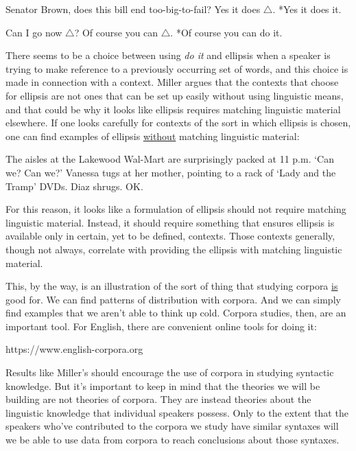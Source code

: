 {\begin{exe}
	\raggedright
	\ex \label{ex:quesell} 
	\begin{xlist}
		 Senator Brown, does this bill end too-big-to-fail?
		 Yes it does $\triangle$.
		 *Yes it does it.
	\end{xlist}
	\ex \label{ex:quesell2}
	\begin{xlist}
		 Can I go now $\triangle$?
		 Of course you can $\triangle$.
		 *Of course you can do it.
	\end{xlist}
\end{exe}
There seems to be a choice between using \emph{do it} and ellipsis when a speaker is trying to make reference to a previously occurring set of words, and this choice is made in connection with a context. Miller argues that the contexts that choose for ellipsis are not ones that can be set up easily without using linguistic means, and that could be why it looks like ellipsis requires matching linguistic material elsewhere. If one looks carefully for contexts of the sort in which ellipsis is chosen, one can find examples of ellipsis \underline{without} matching linguistic material:
\begin{exe}
	\raggedright
	\ex \label{ex:exo} 
	The aisles at the Lakewood Wal-Mart are surprisingly packed at 11 p.m. `Can we? Can we?' Vanessa tugs at her mother, pointing to a rack of `Lady and the Tramp' DVDs. Diaz shrugs. OK.
\end{exe}
For this reason, it looks like a formulation of ellipsis should not require matching linguistic material. Instead, it should require something that ensures ellipsis is available only in certain, yet to be defined, contexts. Those contexts generally, though not always, correlate with providing the ellipsis with matching linguistic material. 

This, by the way, is an illustration of the sort of thing that studying corpora \underline{is} good for. We can find patterns of distribution with corpora. And we can simply find examples that we aren't able to think up cold. Corpora studies, then, are an important tool. For English, there are convenient online tools for doing it:
\begin{exe}
	\raggedright
	\ex \label{ex:url} https://www.english-corpora.org
\end{exe}
Results like Miller's should encourage the use of corpora in studying syntactic knowledge. But it's important to keep in mind that the theories we will be building are not theories of corpora. They are instead theories about the linguistic knowledge that individual speakers possess. Only to the extent that the speakers who've contributed to the corpora we study have similar syntaxes will we be able to use data from corpora to reach conclusions about those syntaxes. 

}

